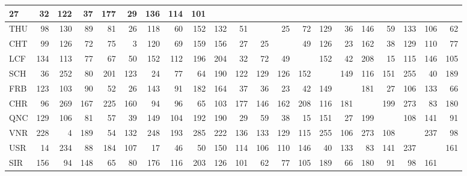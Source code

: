 \documentclass[12pt,a4paper]{report}
\theoremstyle{break}
\theoremstyle{plain}
\begin{document}
\begin{sideways}
\begin{tabular}{|l|r|r|r|r|r|r|r|r|r|r||r|r|r|r|r|r|r|r|r|r|}
27 &  32 & 122 &  37 & 177 &  29 & 136 & 114 & 101 \\ \hline
THU &  98 & 130 &  89 &  81 &  26 & 118 &  60 & 152 & 132 &  51 & &  25 &  72 & 129 &  36 & 146 &  59 & 133 & 106 &  62 \\
CHT &  99 & 126 &  72 &  75 &   3 & 120 &  69 & 159 & 156 &  27 &  25 & &  49 & 126 &  23 & 162 &  38 & 129 & 110 &  77 \\
LCF & 134 & 113 &  77 &  67 &  50 & 152 & 112 & 196 & 204 &  32 &  72 &  49 & & 152 &  42 & 208 &  15 & 115 & 146 & 105 \\
SCH &  36 & 252 &  80 & 201 & 123 &  24 &  77 &  64 & 190 & 122 & 129 & 126 & 152 & & 149 & 116 & 151 & 255 &  40 & 189 \\
FRB & 123 & 103 &  90 &  52 &  26 & 143 &  91 & 182 & 164 &  37 &  36 &  23 &  42 & 149 & & 181 &  27 & 106 & 133 &  66 \\
CHR &  96 & 269 & 167 & 225 & 160 &  94 &  96 &  65 & 103 & 177 & 146 & 162 & 208 & 116 & 181 & & 199 & 273 &  83 & 180 \\
QNC & 129 & 106 &  81 &  57 &  39 & 149 & 104 & 192 & 190 &  29 &  59 &  38 &  15 & 151 &  27 & 199 & & 108 & 141 &  91 \\
VNR & 228 &   4 & 189 &  54 & 132 & 248 & 193 & 285 & 222 & 136 & 133 & 129 & 115 & 255 & 106 & 273 & 108 & & 237 &  98 \\
USR &  14 & 234 &  88 & 184 & 107 &  17 &  46 &  50 & 150 & 114 & 106 & 110 & 146 &  40 & 133 &  83 & 141 & 237 & & 161 \\
SIR & 156 &  94 & 148 &  65 &  80 & 176 & 116 & 203 & 126 & 101 &  62 &  77 & 105 & 189 &  66 & 180 &  91 &  98 & 161 & \\
\hline\end{tabular}
\end{sideways}
\end{document}
